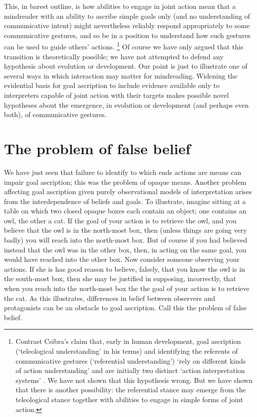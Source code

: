 \documentclass[14pt,a4paper]{extarticle}
\begin{document}
This, in barest outline, is 
how
abilities to engage in joint action
mean that 
a mindreader with an ability to ascribe simple goals only (and no understanding of communicative intent)
might 
nevertheless reliably respond appropriately to some communicative gestures,
and so be in a position to understand how such gestures can be used to guide others' actions.%
\footnote{
Contrast Csibra's claim that,
early in human development,
goal ascription (`teleological understanding' in his terms)
and 
identifying the referents of communicative gestures (`referential understanding')
`rely on different kinds of action understanding' %
and
are initially two distinct `action interpretation systems'   \citep[p.\ 456]{Csibra:2003kp}.
We have not shown that this hypothesis wrong.
But we have shown that there is another possibility:
the referential stance may 
emerge from
the teleological stance
 together with abilities to engage in simple forms of joint action.
}
Of course we have only argued that this transition is theoretically possible;
we have not attempted to defend any hypothesis about evolution or development.
Our point is just to illustrate one of several ways in which
interaction may matter for mindreading.
Widening the evidential basis for goal ascription
to include evidence available only to interpreters capable of joint action with their targets
makes possible 
novel hypotheses about the emergence, in evolution or development (and perhaps even both), of communicative gestures.



\section{The problem of false belief}
\label{sec:false_belief}
We have just seen that 
failure to identify to which ends actions are means can impair goal ascription; this was the problem of opaque means.
Another problem 
affecting goal ascription given purely observational models of interpretation
 arises from the interdependence of beliefs and goals.
To illustrate, 
imagine sitting at a table on which two closed opaque boxes each contain an object; one contains an owl, the other a cat.
If the goal of your action is to retrieve the owl, 
and you believe that the owl is in the north-most box,
then 
(unless things are going very badly) 
you will reach into the north-most box.
But of course if you had believed instead that the owl was in the other box,
then, in acting on the same goal, you would have reached into the other box.
Now consider someone observing your actions.
If she is has good reason to believe, falsely, that you know the owl is in the south-most box,
then she may be justified in supposing, incorrectly, that when you reach into the north-most box the the goal of your action is to retrieve the cat.
As this illustrates,
differences in belief between observers and protagonists can be an obstacle to goal ascription.
Call this the problem of false belief.
\end{document}
